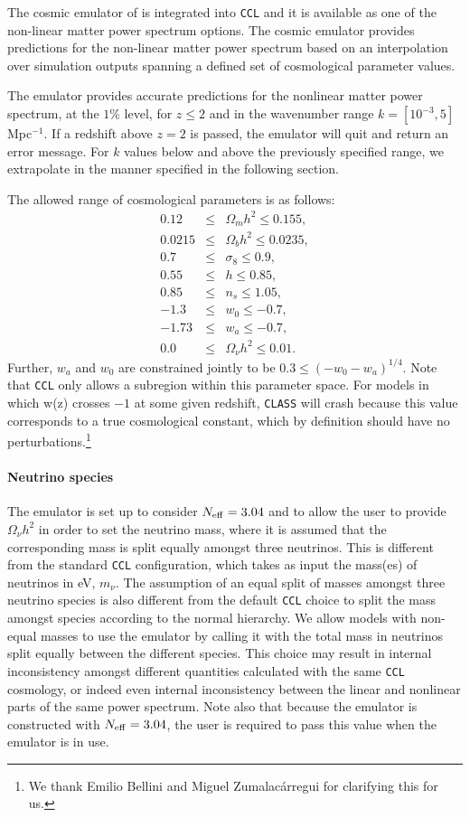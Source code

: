 \documentclass[\docopts]{\docclass}
\newcommand{\ccl}{{\tt CCL}\xspace}
\begin{document}
The cosmic emulator of \citet{Lawrence17} is integrated into \ccl and it is
available as one of the non-linear matter power spectrum options. The cosmic
emulator provides predictions for the non-linear matter power spectrum based on
an interpolation over simulation outputs spanning a defined set of cosmological
parameter values.

The emulator provides accurate predictions for the nonlinear matter power
spectrum, at the $1\%$ level, for $z\leq 2$ and in the wavenumber range
$k=[10^{-3},5]$ Mpc$^{-1}$. If a redshift above $z=2$ is passed, the emulator
will quit and return an error message. For $k$ values below and above the
previously specified range, we extrapolate in the manner specified in the
following section.

The allowed range of cosmological parameters is as follows:
\begin{eqnarray}
0.12&\leq& \Omega_m h^2 \leq 0.155,\nonumber\\
0.0215&\leq& \Omega_b h^2 \leq 0.0235,\nonumber\\
0.7&\leq& \sigma_8 \leq 0.9,\nonumber\\
0.55&\leq& h \leq 0.85,\nonumber\\
0.85&\leq& n_s\leq 1.05,\nonumber\\
-1.3&\leq& w_0\leq-0.7,\nonumber\\
-1.73&\leq& w_a\leq -0.7,\nonumber\\
0.0&\leq& \Omega_\nu h^2 \leq 0.01.
\end{eqnarray}
Further, $w_a$ and $w_0$ are constrained jointly to be $0.3\leq (-w_0-w_a)^{1/4}$.
Note that \ccl only allows a subregion within this parameter space. For models in which w(z) crosses $-1$ at some
given redshift, {\tt CLASS} will crash because this value corresponds
to a true cosmological constant, which by definition should have no
perturbations.\footnote{
  We thank Emilio Bellini and Miguel Zumalac\'arregui for clarifying this for us.}

\paragraph{Neutrino species} The emulator is set up to consider $N_{\rm eff}=3.04$
and to allow the user to provide $\Omega_\nu h^2$ in order to set the
neutrino mass, where it is assumed that the corresponding mass is split equally
amongst three neutrinos. This is different from the standard {\tt CCL}
configuration, which takes as input the mass(es) of neutrinos in eV, $m_{\nu}$.
The assumption of an equal split of masses amongst three neutrino species is
also different from the default \ccl choice to split the mass amongst species
according to the normal hierarchy. We allow models with non-equal masses to use
the emulator by calling it with the total mass in neutrinos split equally between
the different species. This choice may result in internal inconsistency amongst
different quantities calculated with the same \ccl cosmology, or indeed even
internal inconsistency between the linear and nonlinear parts of the same
power spectrum. Note also that because the emulator is constructed with
$N_{\rm eff}=3.04$, the user is required to pass this value when the emulator
is in use.
\end{document}
